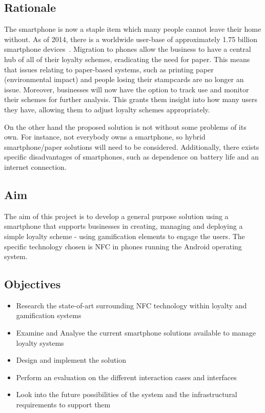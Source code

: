 \clearpage{}

\subsection{Rationale}
The smartphone is now a staple item which many people cannot leave their home without. As of 2014, there is a worldwide user-base of approximately 1.75 billion smartphone devices~\cite{smartUsers}. Migration to phones allow the business to have a central hub of all of their loyalty schemes, eradicating the need for paper. This means that issues relating to paper-based systems, such as printing paper (environmental impact) and people losing their stampcards are no longer an issue. Moreover, businesses will now have the option to track use and monitor their schemes for further analysis. This grants them insight into how many users they have, allowing them to adjust loyalty schemes appropriately.

On the other hand the proposed solution is not without some problems of its own. For instance, not everybody owns a smartphone, so hybrid smartphone/paper solutions will need to be considered. Additionally, there exists specific disadvantages of smartphones, such as dependence on battery life and an internet connection.


\subsection{Aim}
The aim of this project is to develop a general purpose solution using a smartphone that supports businesses in creating, managing and deploying a simple loyalty scheme - using gamification elements to engage the users. The specific technology chosen is NFC in phones running the Android operating system. 


\subsection{Objectives}
\begin{itemize}
    \item Research the state-of-art surrounding NFC technology within loyalty and gamification systems
    \item Examine and Analyse the current smartphone solutions available to manage loyalty systems
    \item Design and implement the solution
    \item Perform an evaluation on the different interaction cases and interfaces
    \item Look into the future possibilities of the system and the infrastructural requirements to support them
\end{itemize}


